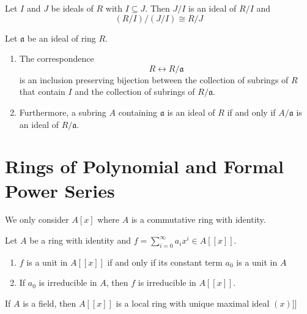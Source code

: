 \begin{theorem}
    Let $I$ and $J$ be ideals of $R$ with $I \subseteq J$. Then $J / I$ is an ideal of $R / I$ and
    \begin{equation*}
        (R / I) /(J / I) \cong R / J
    \end{equation*}
\end{theorem}

\begin{theorem}
    Let $\mathfrak{a}$ be an ideal of ring $R$.
    \begin{enumerate}
        \item
              The correspondence
              \begin{equation}
                  R \leftrightarrow R / \mathfrak{a}
              \end{equation}
              is an inclusion preserving bijection between the collection of subrings of $R$ that contain $I$ and the collection of subrings of $R / \mathfrak{a}$.

        \item
              Furthermore, a subring $A$ containing $\mathfrak{a}$ is an  ideal of $R$ if and only if $A / \mathfrak{a}$ is an ideal of $R / \mathfrak{a}$.
    \end{enumerate}
\end{theorem}



\section{Rings of Polynomial and Formal Power Series}
We only consider $A\left[x\right]$ where $A$ is a commutative ring with identity.

\begin{proposition}
    Let $A$ be a ring with identity and $f=\sum_{i=0}^{\infty} a_{i} x^{i} \in A[[x]]$.
    \begin{enumerate}
        \item
              $f$ is a unit in $A[[x]]$ if and only if its constant term $a_0$ is a unit in $A$
        \item
              If $a_0$ is irreducible in $A$, then $f$ is irreducible in $A[[x]]$.
    \end{enumerate}
\end{proposition}


\begin{corollary}
    If $A$ is a field, then $A[[x]]$ is a local ring with unique maximal ideal $\left(x\right)]]$
\end{corollary}









